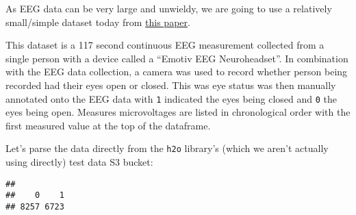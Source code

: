 \documentclass[
]{article}
\newenvironment{Shaded}{\begin{snugshade}}{\end{snugshade}}
\newcommand{\AttributeTok}[1]{\textcolor[rgb]{0.13,0.29,0.53}{#1}}
\newcommand{\CommentTok}[1]{\textcolor[rgb]{0.56,0.35,0.01}{\textit{#1}}}
\newcommand{\DecValTok}[1]{\textcolor[rgb]{0.00,0.00,0.81}{#1}}
\newcommand{\FloatTok}[1]{\textcolor[rgb]{0.00,0.00,0.81}{#1}}
\newcommand{\FunctionTok}[1]{\textcolor[rgb]{0.13,0.29,0.53}{\textbf{#1}}}
\newcommand{\NormalTok}[1]{#1}
\newcommand{\OtherTok}[1]{\textcolor[rgb]{0.56,0.35,0.01}{#1}}
\newcommand{\SpecialCharTok}[1]{\textcolor[rgb]{0.81,0.36,0.00}{\textbf{#1}}}
\newcommand{\StringTok}[1]{\textcolor[rgb]{0.31,0.60,0.02}{#1}}
\begin{document}
As EEG data can be very large and unwieldy, we are going to use a
relatively small/simple dataset today from
\href{http://ehrai.com/su/pdf/aihls2013.pdf}{this paper}.

This dataset is a 117 second continuous EEG measurement collected from a
single person with a device called a ``Emotiv EEG Neuroheadset''. In
combination with the EEG data collection, a camera was used to record
whether person being recorded had their eyes open or closed. This was
eye status was then manually annotated onto the EEG data with \texttt{1}
indicated the eyes being closed and \texttt{0} the eyes being open.
Measures microvoltages are listed in chronological order with the first
measured value at the top of the dataframe.

Let's parse the data directly from the \texttt{h2o} library's (which we
aren't actually using directly) test data S3 bucket:

\begin{Shaded}
\end{Shaded}

\begin{verbatim}
## 
##    0    1 
## 8257 6723
\end{verbatim}

\begin{Shaded}
\end{Shaded}
\end{document}
